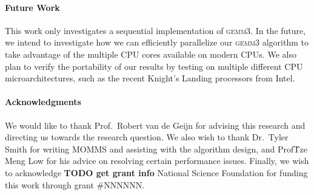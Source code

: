 \documentclass[12pt]{article}
\newcommand*{\gemmt}{{\textsc{gemm3}}}
\begin{document}
\paragraph{Future Work} This work only investigates a sequential implementation of \gemmt{}.
In the future, we intend to investigate how we can efficiently parallelize our \gemmt{} algorithm to take advantage of the multiple CPU cores available on modern CPUs.
We also plan to verify the portability of our results by testing on multiple different CPU microarchitectures, such as the recent Knight's Landing processors from Intel.

\paragraph{Acknowledgments}
We would like to thank Prof.\ Robert van de Geijn for advising this research and directing us towards the research question.
We also wish to thank Dr.\ Tyler Smith for writing MOMMS and assisting with the algorithm design, and Prof\. Tze Meng Low for his advice on resolving certain performance issues.
Finally, we wish to acknowledge \textbf{TODO get grant info} National Science Foundation for funding this work through grant \#NNNNNN.
\printbibliography{}
\end{document}
